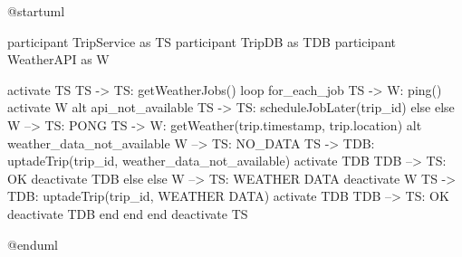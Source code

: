 @startuml

participant TripService as TS
participant TripDB as TDB
participant WeatherAPI as W

activate TS
TS -> TS: getWeatherJobs()
loop for_each_job
TS -> W: ping()
activate W
alt api_not_available
TS -> TS: scheduleJobLater(trip_id)
else else 
W --> TS: PONG
TS -> W: getWeather(trip.timestamp, trip.location)
alt weather_data_not_available
W --> TS: NO_DATA
TS -> TDB: uptadeTrip(trip_id, weather_data_not_available)
activate TDB
TDB --> TS: OK
deactivate TDB
else else 
W --> TS: WEATHER DATA
deactivate W
TS -> TDB: uptadeTrip(trip_id, WEATHER DATA)
activate TDB
TDB --> TS: OK
deactivate TDB
end
end
end
deactivate TS

@enduml